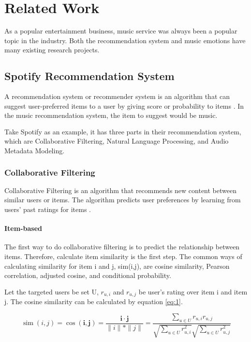 \chapter{Related Work}
\label{ch:relatedwork}

As a popular entertainment business, music service was always been a popular topic in the industry. Both the recommendation system and music emotions have many existing research projects.

\section{Spotify Recommendation System}

A recommendation system or recommender system is an algorithm that can suggest user-preferred items to a user by giving score or probability to items \cite{ricci2011introduction}. In the music recommendation system, the item to suggest would be music.

Take Spotify as an example, it has three parts in their recommendation system, which are Collaborative Filtering, Natural Language Processing, and Audio Metadata Modeling.

\subsection{Collaborative Filtering}

Collaborative Filtering \cite{Su2009} is an algorithm that recommends new content between similar users or items. The algorithm predicts user preferences by learning from users' past ratings for items  \cite{Celma2010}.

\subsubsection{Item-based}

The first way to do collaborative filtering is to predict the relationship between items. Therefore, calculate item similarity is the first step. The common ways of calculating similarity for item i and j, sim(i,j), are cosine similarity, Pearson correlation, adjusted cosine, and conditional probability.

Let the targeted users be set U, $r_{u, i}$ and $r_{u, j}$ be user's rating over item i and item j. The cosine similarity can be calculated by equation \eqref{eq:1}.

\begin{equation}
  \operatorname{sim}(i, j)=\cos (\mathbf{i}, \mathbf{j})=\frac{\mathbf{i} \cdot \mathbf{j}}{\|i\| *\|j\|}=\frac{\sum_{u \in U} r_{u, i} r_{u, j}}{\sqrt{\sum_{u \in U} r_{u, i}^{2}} \sqrt{\sum_{u \in U} r_{u, j}^{2}}}
  \label{eq:1}
\end{equation}

